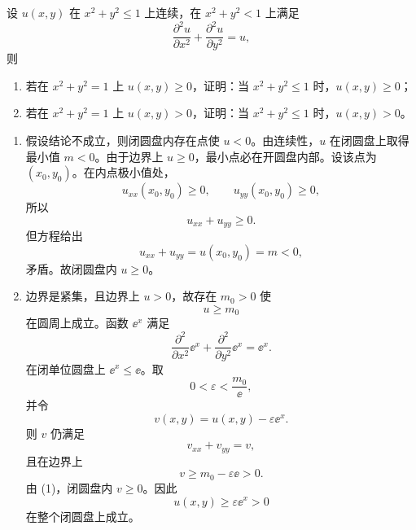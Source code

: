 \begin{xreferenceproblem}[10]
设 $u(x,y)$ 在 $x^2+y^2\le1$ 上连续，在 $x^2+y^2<1$ 上满足
  \[
    \frac{\partial^2u}{\partial x^2}+\frac{\partial^2u}{\partial y^2}=u,
  \]
  则
  \begin{enumerate}[label=(\arabic*)]
    \item 若在 $x^2+y^2=1$ 上 $u(x,y)\ge0$，证明：当 $x^2+y^2\le1$ 时，$u(x,y)\ge0$；
    \item 若在 $x^2+y^2=1$ 上 $u(x,y)>0$，证明：当 $x^2+y^2\le1$ 时，$u(x,y)>0$。
  \end{enumerate}
\end{xreferenceproblem}
\begin{xsolution}
\begin{enumerate}[label=(\arabic*)]
  \item 假设结论不成立，则闭圆盘内存在点使 $u<0$。由连续性，$u$ 在闭圆盘上取得最小值 $m<0$。由于边界上 $u\ge0$，最小点必在开圆盘内部。设该点为 $(x_0,y_0)$。在内点极小值处，
  \[
    u_{xx}(x_0,y_0)\ge0,
    \qquad
    u_{yy}(x_0,y_0)\ge0,
  \]
  所以
  \[
    u_{xx}+u_{yy}\ge0.
  \]
  但方程给出
  \[
    u_{xx}+u_{yy}=u(x_0,y_0)=m<0,
  \]
  矛盾。故闭圆盘内 $u\ge0$。

  \item 边界是紧集，且边界上 $u>0$，故存在 $m_0>0$ 使
  \[
    u\ge m_0
  \]
  在圆周上成立。函数 $\ee^x$ 满足
  \[
    \frac{\partial^2}{\partial x^2}\ee^x
    +\frac{\partial^2}{\partial y^2}\ee^x
    =\ee^x.
  \]
  在闭单位圆盘上 $\ee^x\le\ee$。取
  \[
    0<\varepsilon<\frac{m_0}{\ee},
  \]
  并令
  \[
    v(x,y)=u(x,y)-\varepsilon\ee^x.
  \]
  则 $v$ 仍满足
  \[
    v_{xx}+v_{yy}=v,
  \]
  且在边界上
  \[
    v\ge m_0-\varepsilon\ee>0.
  \]
  由 (1)，闭圆盘内 $v\ge0$。因此
  \[
    u(x,y)\ge\varepsilon\ee^x>0
  \]
  在整个闭圆盘上成立。
\end{enumerate}
\end{xsolution}


